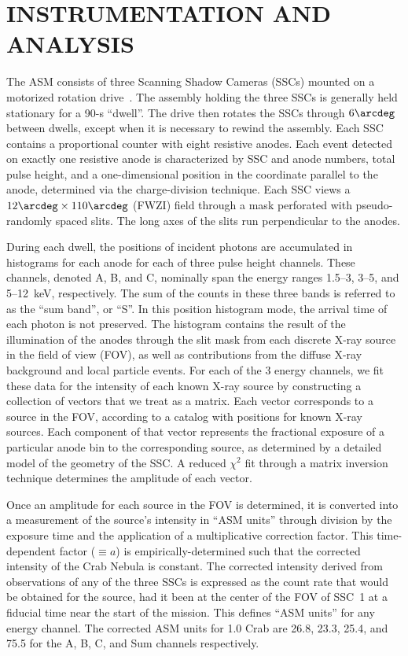 \documentclass{aastex}
\begin{document}
\section{INSTRUMENTATION AND ANALYSIS}\label{sec:lcdat}

The ASM consists of three Scanning Shadow Cameras (SSCs) mounted on a
motorized rotation drive~\citep{lbcjm96}.  The assembly holding the
three SSCs is generally held stationary for a 90-s ``dwell''.  The
drive then rotates the SSCs through $6\arcdeg$ between dwells, except
when it is necessary to rewind the assembly.  Each SSC contains a
proportional counter with eight resistive anodes.  Each event detected
on exactly one resistive anode is characterized by SSC and anode
numbers, total pulse height, and a one-dimensional position in the
coordinate parallel to the anode, determined via the charge-division
technique.  Each SSC views a $12\arcdeg \times 110\arcdeg$ (FWZI)
field through a mask perforated with pseudo-randomly spaced slits.
The long axes of the slits run perpendicular to the anodes.

During each dwell, the positions of incident photons are accumulated
in histograms for each anode for each of three pulse height channels.
These channels, denoted A, B, and C, nominally span the energy ranges
1.5--3, 3--5, and 5--12~keV, respectively.  The sum of the counts in
these three bands is referred to as the ``sum band'', or ``S''.  In
this position histogram mode, the arrival time of each photon is not
preserved.  The histogram contains the result of the illumination of
the anodes through the slit mask from each discrete X-ray source in
the field of view (FOV), as well as contributions from the diffuse
X-ray background and local particle events.  For each of the 3 energy
channels, we fit these data for the intensity of each known X-ray
source by constructing a collection of vectors that we treat as a
matrix.  Each vector corresponds to a source in the FOV, according to
a catalog with positions for known X-ray sources.  Each component of
that vector represents the fractional exposure of a particular anode
bin to the corresponding source, as determined by a detailed model of
the geometry of the SSC.  A reduced $\chi^2$ fit through a matrix
inversion technique determines the amplitude of each vector.

Once an amplitude for each source in the FOV is determined, it is
converted into a measurement of the source's intensity in ``ASM
units'' through division by the exposure time and the application of a
multiplicative correction factor.  This time-dependent factor ($\equiv
a$) is empirically-determined such that the corrected intensity of the
Crab Nebula is constant.  The corrected intensity derived from
observations of any of the three SSCs is expressed as the count rate
that would be obtained for the source, had it been at the center of
the FOV of SSC~1 at a fiducial time near the start of the mission.
This defines ``ASM units'' for any energy channel.  The corrected ASM
units for 1.0 Crab are 26.8, 23.3, 25.4, and 75.5 for the A, B, C, and
Sum channels respectively.
\end{document}
